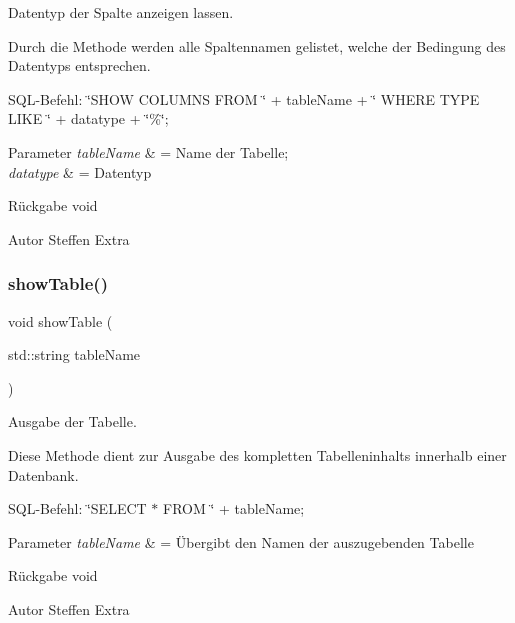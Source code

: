 Datentyp der Spalte anzeigen lassen. 

Durch die Methode werden alle Spaltennamen gelistet, welche der Bedingung des Datentyps entsprechen.~\newline


S\+Q\+L-\/\+Befehl\+: \char`\"{}\+S\+H\+O\+W C\+O\+L\+U\+M\+N\+S F\+R\+O\+M \char`\"{} + table\+Name + \char`\"{} W\+H\+E\+R\+E T\+Y\+P\+E L\+I\+K\+E \textquotesingle{}\char`\"{} + datatype + \char`\"{}\%\textquotesingle{}\char`\"{};


\begin{DoxyParams}{Parameter}
{\em table\+Name} & = Name der Tabelle; \\
\hline
{\em datatype} & = Datentyp\\
\hline
\end{DoxyParams}
\begin{DoxyReturn}{Rückgabe}
void
\end{DoxyReturn}
\begin{DoxyAuthor}{Autor}
Steffen Extra 
\end{DoxyAuthor}
\mbox{\label{tables_8hpp_a22fbeb7f18a00bafd4864de51a3bca28}} 
\subsubsection{show\+Table()}
{\footnotesize\ttfamily void show\+Table (\begin{DoxyParamCaption}\item[{std\+::string}]{table\+Name }\end{DoxyParamCaption})}



Ausgabe der Tabelle. 

Diese Methode dient zur Ausgabe des kompletten Tabelleninhalts innerhalb einer Datenbank.~\newline


S\+Q\+L-\/\+Befehl\+: \char`\"{}\+S\+E\+L\+E\+C\+T $\ast$ F\+R\+O\+M \char`\"{} + table\+Name;


\begin{DoxyParams}{Parameter}
{\em table\+Name} & = Übergibt den Namen der auszugebenden Tabelle\\
\hline
\end{DoxyParams}
\begin{DoxyReturn}{Rückgabe}
void
\end{DoxyReturn}
\begin{DoxyAuthor}{Autor}
Steffen Extra 
\end{DoxyAuthor}
